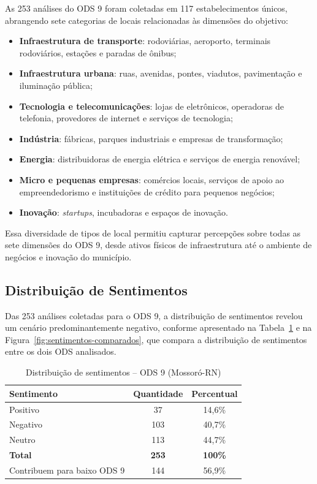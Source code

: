 As 253 análises do ODS 9 foram coletadas em 117 estabelecimentos únicos, abrangendo sete categorias de locais relacionadas às dimensões do objetivo:

\begin{itemize}
    \item \textbf{Infraestrutura de transporte}: rodoviárias, aeroporto, terminais rodoviários, estações e paradas de ônibus;
    \item \textbf{Infraestrutura urbana}: ruas, avenidas, pontes, viadutos, pavimentação e iluminação pública;
    \item \textbf{Tecnologia e telecomunicações}: lojas de eletrônicos, operadoras de telefonia, provedores de internet e serviços de tecnologia;
    \item \textbf{Indústria}: fábricas, parques industriais e empresas de transformação;
    \item \textbf{Energia}: distribuidoras de energia elétrica e serviços de energia renovável;
    \item \textbf{Micro e pequenas empresas}: comércios locais, serviços de apoio ao empreendedorismo e instituições de crédito para pequenos negócios;
    \item \textbf{Inovação}: \textit{startups}, incubadoras e espaços de inovação.
\end{itemize}

Essa diversidade de tipos de local permitiu capturar percepções sobre todas as sete dimensões do ODS 9, desde ativos físicos de infraestrutura até o ambiente de negócios e inovação do município.

\subsection{Distribuição de Sentimentos}
\label{subsec:sentimentos-ods9}

Das 253 análises coletadas para o ODS 9, a distribuição de sentimentos revelou um cenário predominantemente negativo, conforme apresentado na Tabela~\ref{tab:sentimentos-ods9} e na Figura~\ref{fig:sentimentos-comparados}, que compara a distribuição de sentimentos entre os dois ODS analisados.

\begin{table}[h!]
    \centering
    \caption{Distribuição de sentimentos -- ODS 9 (Mossoró-RN)}
    \label{tab:sentimentos-ods9}
    \begin{tabular}{lcc}
        \hline
        \textbf{Sentimento} & \textbf{Quantidade} & \textbf{Percentual} \\
        \hline
        Positivo & 37 & 14,6\% \\
        Negativo & 103 & 40,7\% \\
        Neutro & 113 & 44,7\% \\
        \hline
        \textbf{Total} & \textbf{253} & \textbf{100\%} \\
        Contribuem para baixo ODS 9 & 144 & 56,9\% \\
        \hline
    \end{tabular}
\end{table}

